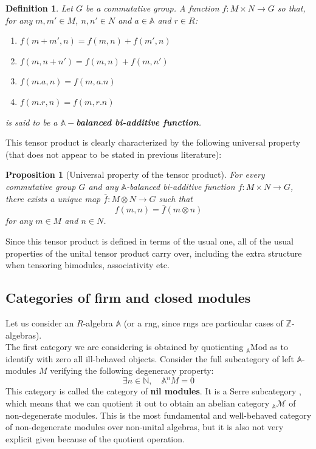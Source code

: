 \documentclass[a4paper,fleqn]{cas-sc}
\newtheorem{prop}[thm]{Proposition}%
\newtheorem{dfnt}{Definition}%
\newcommand{\bA}{\mathbb{A}}
\newcommand{\qmod}{\mathrm{Mod}}
\begin{document}
\begin{dfnt}
Let $G$ be a commutative group. A function $f : M \times N \to G$ so that, for any $m,m' \in M$, $n,n' \in N$ and $a\in \bA$ and $r \in R$:
\begin{enumerate}
    \item $f(m+m',n) = f(m,n) + f(m',n)$
    \item $f(m, n+n')=f(m,n) + f(m,n')$
    \item $f(m.a, n) = f(m,a.n)$
    \item $f(m.r, n) = f(m,r.n)$
\end{enumerate}
is said to be a $\bA-$\textbf{balanced bi-additive function}. %
\end{dfnt}

This tensor product is clearly characterized by the following universal property (that does not appear to be stated in previous literature):
\begin{prop}[Universal property of the tensor product]
For every commutative group $G$ and any $\bA$-balanced bi-additive function $f: M \times N \to G$,
there exists a unique map $\overline{f} : M \otimes N \to G$ such that 
\[f(m,n) = \overline{f} (m \otimes n)\]
for any $m \in M$ and $n \in N$.
\end{prop}

Since this tensor product is defined in terms of the usual one, all of the usual properties of the unital tensor product carry over, including the extra structure when tensoring bimodules,  associativity etc.





\subsection{Categories of firm and closed modules}
Let us consider an $R$-algebra $\bA$ (or a rng, since rngs are particular cases of $\mathbb{Z}$-algebras).\\

The first category we are considering %
is obtained by quotienting $_\bA \qmod$ as to identify with zero all ill-behaved objects. Consider the full subcategory of left $\bA$-modules $M$ verifying the following degeneracy property:
\[
\exists n \in \mathbb{N}, \quad
\bA^n M = 0
\]
This category is called the category of \textbf{nil modules}. It is a Serre subcategory \cite{serre}, %
which means that we can quotient it out to obtain an abelian category $\mathbf{_\bA \mathcal{M}}$ of non-degenerate modules. This is the most fundamental and well-behaved category of non-degenerate modules over non-unital algebras, but it is also not very explicit given because of the quotient operation.
\end{document}
